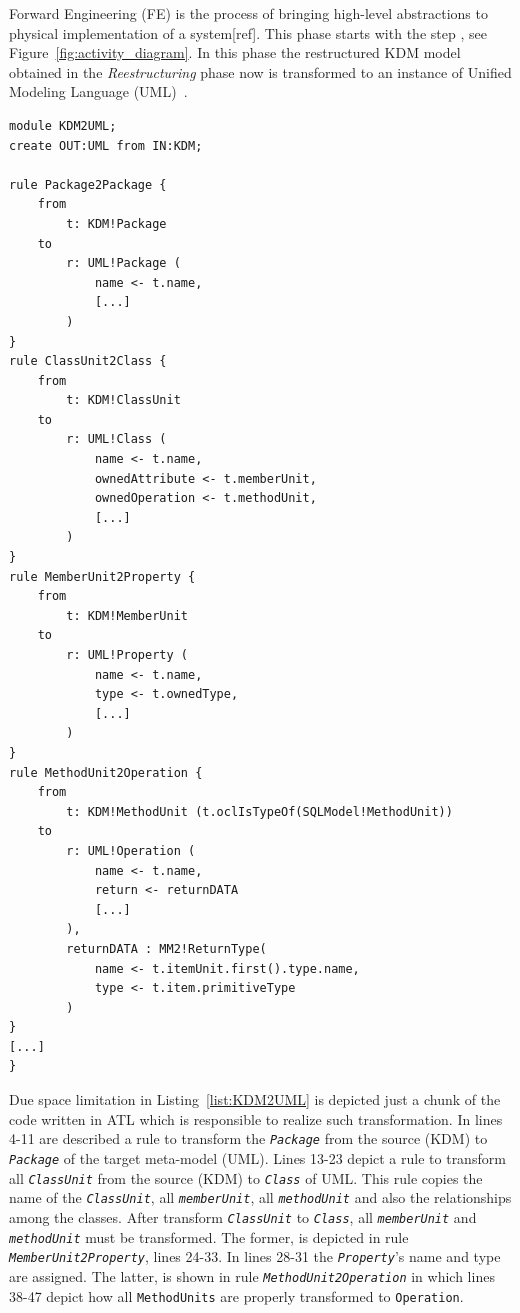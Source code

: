 \documentclass[a4paper,twoside]{article}
\newcommand*\circled[1]{\tikz[baseline=(char.base)]{
  \node[shape=circle,draw, inner sep=0.1pt] (char) {#1};}
}
\begin{document}
Forward Engineering (FE) is the process of bringing high-level abstractions to physical implementation of a system[ref]. This phase starts with the step \circled{\textbf{K}}, see Figure~\ref{fig:activity_diagram}. In this phase the restructured KDM model obtained in the \textit{Reestructuring} phase now is transformed to an instance of Unified Modeling Language (UML)~\cite{OMG}. 

\begin{lstlisting}[caption=Chunk of KDM2UML, label=list:KDM2UML, frame=lrtb, basicstyle=\tiny]
module KDM2UML;
create OUT:UML from IN:KDM;

rule Package2Package {
	from 
		t: KDM!Package
	to
		r: UML!Package (	
			name <- t.name,
			[...]
		)
}
rule ClassUnit2Class {
	from
		t: KDM!ClassUnit
	to
		r: UML!Class (
			name <- t.name,
			ownedAttribute <- t.memberUnit,
			ownedOperation <- t.methodUnit,
			[...]
		)
}
rule MemberUnit2Property {
	from
		t: KDM!MemberUnit
	to
		r: UML!Property (
			name <- t.name,
			type <- t.ownedType,
			[...]
		)
}
rule MethodUnit2Operation {	
	from
		t: KDM!MethodUnit (t.oclIsTypeOf(SQLModel!MethodUnit))
	to
		r: UML!Operation (
			name <- t.name,
			return <- returnDATA
			[...]
		),
		returnDATA : MM2!ReturnType(
			name <- t.itemUnit.first().type.name,
			type <- t.item.primitiveType
		)
}
[...]
}
\end{lstlisting}

Due space limitation in Listing~\ref{list:KDM2UML} is depicted just a chunk of the code written in ATL which is responsible to realize such transformation. In lines 4-11 are described a rule to transform the \textit{\texttt{Package}} from the source (KDM) to \textit{\texttt{Package}} of the target meta-model (UML). Lines 13-23 depict a rule to transform all \textit{\texttt{ClassUnit}} from the source (KDM) to \textit{\texttt{Class}} of UML. This rule copies the name of the \textit{\texttt{ClassUnit}}, all \textit{\texttt{memberUnit}}, all \textit{\texttt{methodUnit}} and also the relationships among the classes. After transform \textit{\texttt{ClassUnit}} to \textit{\texttt{Class}}, all \textit{\texttt{memberUnit}} and \textit{\texttt{methodUnit}} must be transformed. The former, is depicted in rule \textit{\texttt{MemberUnit2Property}}, lines 24-33. In lines 28-31 the \textit{\texttt{Property}}'s name and type are assigned. The latter, is shown in rule \textit{\texttt{MethodUnit2Operation}} in which lines 38-47 depict how all \texttt{MethodUnits} are properly transformed to \texttt{Operation}.  
\end{document}
